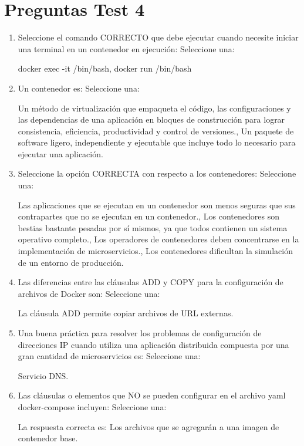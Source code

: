 \documentclass[12pt, twoside, openright]{report} %
\begin{document}
\section{Preguntas Test 4}
\begin{enumerate}
	\item Seleccione el comando CORRECTO que debe ejecutar cuando necesite iniciar una terminal en un contenedor en ejecución:
	      Seleccione una:

	      docker exec -it /bin/bash, docker run /bin/bash

	\item Un contenedor es:
	      Seleccione una:

	      Un método de virtualización que empaqueta el código, las configuraciones y las dependencias de una aplicación en bloques de construcción para lograr consistencia, eficiencia, productividad y control de versiones., Un paquete de software ligero, independiente y ejecutable que incluye todo lo necesario para ejecutar una aplicación.

	\item Seleccione la opción CORRECTA con respecto a los contenedores:
	      Seleccione una:

	      Las aplicaciones que se ejecutan en un contenedor son menos seguras que sus contrapartes que no se ejecutan en un contenedor., Los contenedores son bestias bastante pesadas por sí mismos, ya que todos contienen un sistema operativo completo., Los operadores de contenedores deben concentrarse en la implementación de microservicios., Los contenedores dificultan la simulación de un entorno de producción.

	\item Las diferencias entre las cláusulas ADD y COPY para la configuración de archivos de Docker son:
	      Seleccione una:

	      La cláusula ADD permite copiar archivos de URL externas.

	\item Una buena práctica para resolver los problemas de configuración de direcciones IP cuando utiliza una aplicación distribuida compuesta por una gran cantidad de microservicios es:
	      Seleccione una:

	      Servicio DNS.

	\item Las cláusulas o elementos que NO se pueden configurar en el archivo yaml docker-compose incluyen:
	      Seleccione una:

	      La respuesta correcta es: Los archivos que se agregarán a una imagen de contenedor base.


\end{enumerate}
\end{document}
